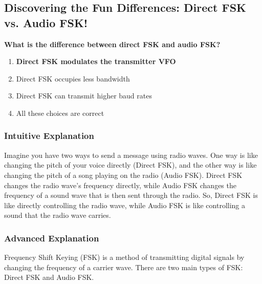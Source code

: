 \subsection{Discovering the Fun Differences: Direct FSK vs. Audio FSK!}
\label{sec:E2E11}

\begin{tcolorbox}[colback=gray!10!white,colframe=black!75!black,title=\textbf{E2E11}]
\textbf{What is the difference between direct FSK and audio FSK?}
\begin{enumerate}[label=\Alph*.]
    \item \textbf{Direct FSK modulates the transmitter VFO}
    \item Direct FSK occupies less bandwidth
    \item Direct FSK can transmit higher baud rates
    \item All these choices are correct
\end{enumerate}
\end{tcolorbox}

\subsubsection{Intuitive Explanation}
Imagine you have two ways to send a message using radio waves. One way is like changing the pitch of your voice directly (Direct FSK), and the other way is like changing the pitch of a song playing on the radio (Audio FSK). Direct FSK changes the radio wave's frequency directly, while Audio FSK changes the frequency of a sound wave that is then sent through the radio. So, Direct FSK is like directly controlling the radio wave, while Audio FSK is like controlling a sound that the radio wave carries.

\subsubsection{Advanced Explanation}
Frequency Shift Keying (FSK) is a method of transmitting digital signals by changing the frequency of a carrier wave. There are two main types of FSK: Direct FSK and Audio FSK.

